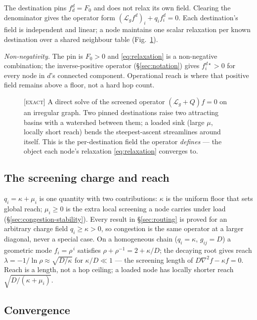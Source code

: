 \documentclass[11pt]{article}
\theoremstyle{plain}
\numberwithin{equation}{section}
\begin{document}
The destination pins $f^d_d=F_0$ and does not relax its own field. Clearing the denominator gives the operator form $(\mathcal{L}_g f^d)_i + q_i f^d_i = 0$. Each destination's field is independent and linear; a node maintains one scalar relaxation per known destination over a shared neighbour table (Fig.~\ref{fig:multisource}).

\emph{Non-negativity.} The pin is $F_0>0$ and \eqref{eq:relaxation} is a non-negative combination; the inverse-positive operator (§\ref{sec:notation}) gives $f^{d\star}_i>0$ for every node in $d$'s connected component. Operational reach is where that positive field remains above a floor, not a hard hop count.

\begin{figure}[tbp]
\centering

\caption{\textsc{[exact]} A direct solve of the screened operator $(\mathcal{L}_g+Q)f=0$ on an irregular graph. Two pinned destinations raise two attracting basins with a watershed between them; a loaded sink (large $\mu$, locally short reach) bends the steepest-ascent streamlines around itself. This is the per-destination field the operator \emph{defines} — the object each node's relaxation \eqref{eq:relaxation} converges to.}
\label{fig:multisource}
\end{figure}

\subsection{The screening charge and reach}\label{sec:reach}

$q_i=\kappa+\mu_i$ is one quantity with two contributions: $\kappa$ is the uniform floor that sets global reach; $\mu_i\ge 0$ is the extra local screening a node carries under load (§\ref{sec:congestion-stability}). Every result in §\ref{sec:routing} is proved for an arbitrary charge field $q_i\ge\kappa>0$, so congestion is the same operator at a larger diagonal, never a special case. On a homogeneous chain ($q_i=\kappa$, $g_{ij}=D$) a geometric mode $f_i=\rho^{\,i}$ satisfies $\rho+\rho^{-1}=2+\kappa/D$; the decaying root gives reach $\lambda=-1/\ln\rho \approx\sqrt{D/\kappa}$ for $\kappa/D\ll 1$ — the screening length of $D\nabla^2 f-\kappa f=0$. Reach is a length, not a hop ceiling; a loaded node has locally shorter reach $\sqrt{D/(\kappa+\mu_i)}$.

\subsection{Convergence}\label{sec:convergence}
\end{document}
